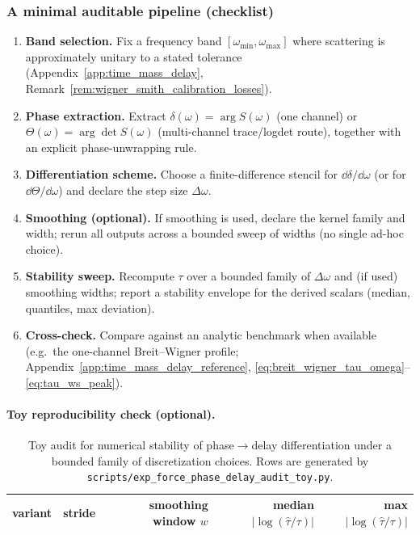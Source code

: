\subsubsection{A minimal auditable pipeline (checklist)}
\begin{enumerate}
\item \textbf{Band selection.} Fix a frequency band $[\omega_{\min},\omega_{\max}]$ where scattering is approximately unitary to a stated tolerance (Appendix~\ref{app:time_mass_delay}, Remark~\ref{rem:wigner_smith_calibration_losses}).
\item \textbf{Phase extraction.} Extract $\delta(\omega)=\arg S(\omega)$ (one channel) or $\Theta(\omega)=\arg\det S(\omega)$ (multi-channel trace/logdet route), together with an explicit phase-unwrapping rule.
\item \textbf{Differentiation scheme.} Choose a finite-difference stencil for $\dd\delta/\dd\omega$ (or for $\dd\Theta/\dd\omega$) and declare the step size $\Delta\omega$.
\item \textbf{Smoothing (optional).} If smoothing is used, declare the kernel family and width; rerun all outputs across a bounded sweep of widths (no single ad-hoc choice).
\item \textbf{Stability sweep.} Recompute $\tau$ over a bounded family of $\Delta\omega$ and (if used) smoothing widths; report a stability envelope for the derived scalars (median, quantiles, max deviation).
\item \textbf{Cross-check.} Compare against an analytic benchmark when available (e.g.\ the one-channel Breit--Wigner profile; Appendix~\ref{app:time_mass_delay_reference}, \eqref{eq:breit_wigner_tau_omega}--\eqref{eq:tau_ws_peak}).
\end{enumerate}

\paragraph{Toy reproducibility check (optional).}
\AuditTag %
\begin{table}[t]
\centering
\small
\setlength{\tabcolsep}{10pt}
\renewcommand{\arraystretch}{1.15}
\begin{tabular}{lrrrr}
\toprule
variant & stride & smoothing window $w$ & median $|\log(\widehat\tau/\tau)|$ & max $|\log(\widehat\tau/\tau)|$ \\
\midrule
%
\end{tabular}
\caption{Toy audit for numerical stability of phase$\to$delay differentiation under a bounded family of discretization choices. Rows are generated by \texttt{scripts/exp\_force\_phase\_delay\_audit\_toy.py}.}
\label{tab:force_phase_delay_audit_toy}
\end{table}

